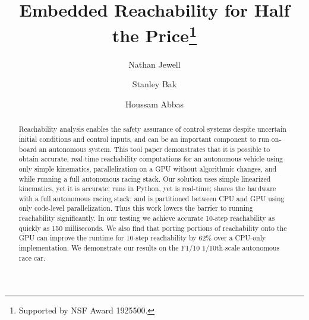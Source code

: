 \documentclass[runningheads]{llncs}
\begin{document}
%
\title{Embedded Reachability for Half the Price\thanks{Supported by NSF Award 1925500.}}
%
%
\author{Nathan Jewell \and
Stanley Bak\and
Houssam Abbas} 
%
%
%
\maketitle              %
%
\begin{abstract}
Reachability analysis enables the safety assurance of control systems despite uncertain initial conditions and control inputs, and can be an important component to run on-board an autonomous system.
This tool paper demonstrates that it is possible to obtain accurate, real-time reachability computations for an autonomous vehicle using only simple kinematics, parallelization on a GPU without algorithmic changes, and while running a full autonomous racing stack.
Our solution uses simple linearized kinematics, yet it is accurate; runs in Python, yet is real-time; shares the hardware with a full autonomous racing stack; and is partitioned between CPU and GPU using only code-level parallelization.
Thus this work lowers the barrier to running reachability significantly.
In our testing we achieve accurate 10-step reachability as quickly as 150 milliseconds. 
We also find that porting portions of reachability onto the GPU can improve the runtime for 10-step reachability by 62\% over a CPU-only implementation.
We demonstrate our results on the F1/10 1/10th-scale autonomous race car.
\end{abstract}
%
%
%
\end{document}

